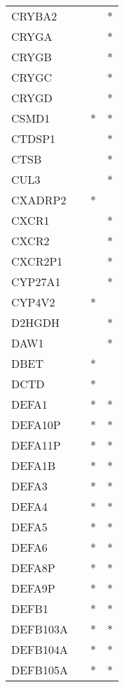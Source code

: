 \begin{longtable}{lccc}
CRYBA2         &       &    &       * \\
CRYGA          &       &    &       * \\
CRYGB          &       &    &       * \\
CRYGC          &       &    &       * \\
CRYGD          &       &    &       * \\
CSMD1          &       &  * &       * \\
CTDSP1         &       &    &       * \\
CTSB           &       &    &       * \\
CUL3           &       &    &       * \\
CXADRP2        &       &  * &         \\
CXCR1          &       &    &       * \\
CXCR2          &       &    &       * \\
CXCR2P1        &       &    &       * \\
CYP27A1        &       &    &       * \\
CYP4V2         &       &  * &         \\
D2HGDH         &       &    &       * \\
DAW1           &       &    &       * \\
DBET           &       &  * &         \\
DCTD           &       &  * &         \\
DEFA1          &       &  * &       * \\
DEFA10P        &       &  * &       * \\
DEFA11P        &       &  * &       * \\
DEFA1B         &       &  * &       * \\
DEFA3          &       &  * &       * \\
DEFA4          &       &  * &       * \\
DEFA5          &       &  * &       * \\
DEFA6          &       &  * &       * \\
DEFA8P         &       &  * &       * \\
DEFA9P         &       &  * &       * \\
DEFB1          &       &  * &       * \\
DEFB103A       &       &  * &       * \\
DEFB104A       &       &  * &       * \\
DEFB105A       &       &  * &       * \\

\end{longtable}
